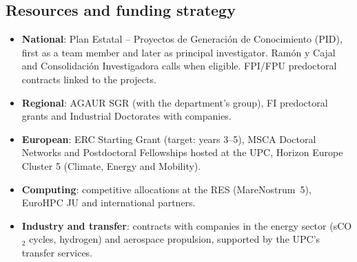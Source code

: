 \documentclass[11pt]{article}
\begin{document}
\subsection{Resources and funding strategy}\label{sec:resources}
\begin{itemize}
\item \textbf{National}: Plan Estatal -- Proyectos de Generación de Conocimiento (PID),
first as a team member and later as principal investigator. Ramón y Cajal and
Consolidación Investigadora calls when eligible. FPI/FPU predoctoral contracts linked to
the projects.
\item \textbf{Regional}: AGAUR SGR (with the department's group), FI predoctoral grants
and Industrial Doctorates with companies.
\item \textbf{European}: ERC Starting Grant (target: years 3--5), MSCA Doctoral Networks and
Postdoctoral Fellowships hosted at the UPC, Horizon Europe Cluster 5 (Climate, Energy
and Mobility).
\item \textbf{Computing}: competitive allocations at the RES (MareNostrum~5), EuroHPC JU and
international partners.
\item \textbf{Industry and transfer}: contracts with companies in the energy sector
(sCO$_2$ cycles, hydrogen) and aerospace propulsion, supported by the UPC's transfer
services.
\end{itemize}
\end{document}
